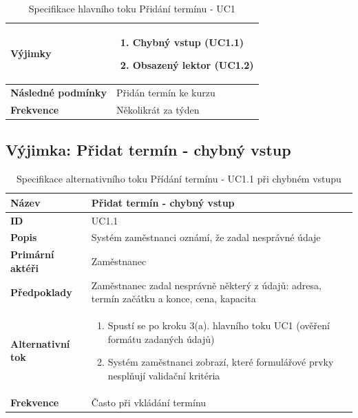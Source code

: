 \documentclass[12pt,a4paper,titlepage,final]{report}
\begin{document}
\begin{table}[h!]
\begin{center}
\begin{tabular}{ | p{4.2cm} | p{12.2cm} | }
    \textbf{Výjimky} & 
    \vspace{-3.5mm}
    \begin{enumerate}
		\itemsep0em 
		\item Chybný vstup (UC1.1)
		\item Obsazený lektor (UC1.2)
	\end{enumerate}
    \\ \hline 
        
    \textbf{Následné podmínky} & Přidán termín ke kurzu
    \\ \hline    
    
	\textbf{Frekvence} & Několikrát za týden
	\\ \hline		
    \end{tabular}
	\end{center}	
	\caption{Specifikace hlavního toku Přidání termínu - UC1}  
\end{table}

\newpage

\subsection{Výjimka: Přidat termín - chybný vstup}

\begin{table}[!h]
	\begin{center}
    \begin{tabular}{ | p{4.2cm} | p{12.2cm} | }
    \hline
    \textbf{Název} & Přidat termín - chybný vstup
    \\ \hline
    
	\textbf{ID} & UC1.1
	\\ \hline
	
	\textbf{Popis} & Systém zaměstnanci oznámí, že zadal nesprávné údaje
	\\ \hline
	    
	\textbf{Primární aktéři} & Zaměstnanec
	\\ \hline
	
	\textbf{Předpoklady} & Zaměstnanec zadal nesprávně některý z údajů: adresa, termín začátku a konce, cena, kapacita
    \\ \hline
    
    \textbf{Alternativní tok} & 
    \vspace{-3.5mm}
    \begin{enumerate}
        \itemsep0em 
    	\item Spustí se po kroku 3(a). hlavního toku UC1 (ověření formátu zadaných údajů)
    	\item Systém zaměstnanci zobrazí, které formulářové prvky nesplňují validační kritéria
    \end{enumerate}
    \\ \hline  
    
	\textbf{Frekvence} & Často při vkládání termínu
	\\ \hline
	\end{tabular}
		\caption{Specifikace alternativního toku Přídání termínu - UC1.1 při chybném vstupu}	
	\end{center}
\end{table}
\end{document}
